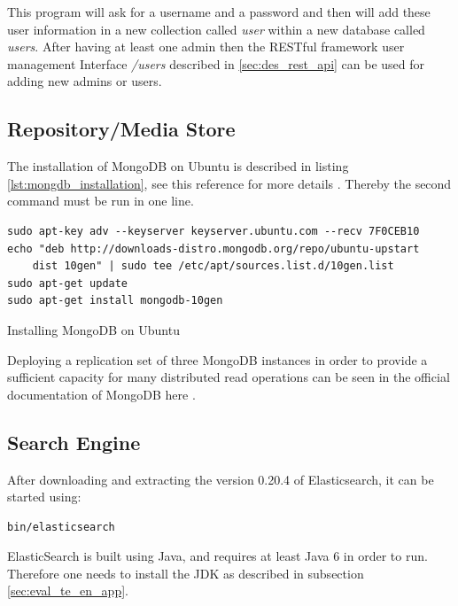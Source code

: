 This program will ask for a username and a password and then will add these user information in a new collection called \textit{user} within a new database called \textit{users}.  After having at least one admin then the RESTful framework user management Interface \textit{/users} described in \ref{sec:des_rest_api} can be used for adding new admins or users.

\subsection{Repository/Media Store\label{sec:eval_te_en_mongo}}
The installation of MongoDB on Ubuntu is described in listing \ref{lst:mongdb_installation}, see this reference for more details \cite{MongoDb:installation}. Thereby the second command must be run in one line.  
\begin{code}
\begin{verbatim}
sudo apt-key adv --keyserver keyserver.ubuntu.com --recv 7F0CEB10
echo "deb http://downloads-distro.mongodb.org/repo/ubuntu-upstart 
	dist 10gen" | sudo tee /etc/apt/sources.list.d/10gen.list
sudo apt-get update
sudo apt-get install mongodb-10gen
\end{verbatim}
\caption{Installing MongoDB on Ubuntu}
\label{lst:mongdb_installation}
\end{code}

Deploying a replication set of three MongoDB instances in order to provide a sufficient capacity for many distributed read operations can be seen in the official documentation of MongoDB here \cite{mongodb_replica_set}.

\subsection{Search Engine\label{sec:eval_te_se}}
After downloading  and extracting the version 0.20.4 of Elasticsearch, it can be started using:
\begin{code}
\begin{verbatim}
bin/elasticsearch
\end{verbatim}
\end{code}

ElasticSearch is built using Java, and requires at least Java 6 in order to run. Therefore one needs to install the \ac{JDK} as described in subsection \ref{sec:eval_te_en_app}.

